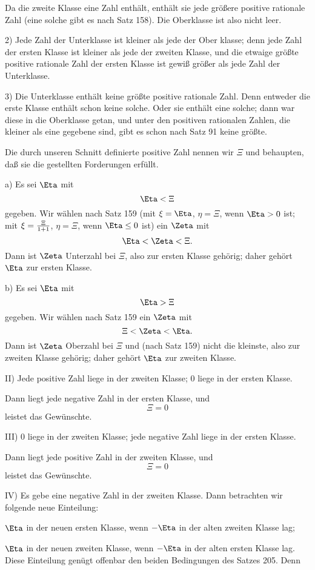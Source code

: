 Da die zweite Klasse eine Zahl enth\"alt, enth\"alt sie jede
gr\"o{\ss}ere positive rationale Zahl (eine solche gibt es nach Satz 158).
Die Oberklasse ist also nicht leer.

2) Jede Zahl der Unterklasse ist kleiner als jede der Ober%
klasse; denn jede Zahl der ersten Klasse ist kleiner als jede der
zweiten Klasse, und die etwaige gr\"o{\ss}te positive rationale Zahl der
ersten Klasse ist gewi{\ss} gr\"o{\ss}er als jede Zahl der Unterklasse.

3) Die Unterklasse enth\"alt keine gr\"o{\ss}te positive rationale
Zahl.  Denn entweder die erste Klasse enth\"alt schon keine solche.
Oder sie enth\"alt eine solche; dann war diese in die Oberklasse
getan, und unter den positiven rationalen Zahlen, die kleiner als
eine gegebene sind, gibt es schon nach Satz 91 keine gr\"o{\ss}te.

Die durch unseren Schnitt definierte positive Zahl nennen wir
$\Xi$ und behaupten, da{\ss} sie die gestellten Forderungen erf\"ullt.

a) Es sei $\Eta$ mit
$$\Eta < \Xi$$
gegeben.  Wir w\"ahlen nach Satz 159 (mit $\xi = \Eta$, $\eta = \Xi$, wenn
$\Eta > 0$ ist; mit $\xi = {\Xi \over 1 + 1}$, $\eta = \Xi$, wenn $\Eta \le 0$ ist) ein $\Zeta$ mit
$$\Eta < \Zeta < \Xi.$$
Dann ist $\Zeta$ Unterzahl bei $\Xi$, also zur ersten Klasse geh\"orig; daher
geh\"ort $\Eta$ zur ersten Klasse.

b) Es sei $\Eta$ mit
$$\Eta > \Xi$$
gegeben.  Wir w\"ahlen nach Satz 159 ein $\Zeta$ mit
$$\Xi < \Zeta < \Eta.$$
Dann ist $\Zeta$ Oberzahl bei $\Xi$ und (nach Satz 159) nicht die kleinste,
also zur zweiten Klasse geh\"orig; daher geh\"ort $\Eta$ zur zweiten
Klasse.

II) Jede positive Zahl liege in der zweiten Klasse; $0$ liege in
der ersten Klasse.

Dann liegt jede negative Zahl in der ersten Klasse, und
$$\Xi = 0$$
leistet das Gew\"unschte.

III) 0 liege in der zweiten Klasse; jede negative Zahl liege
in der ersten Klasse.

Dann liegt jede positive Zahl in der zweiten Klasse, und
$$\Xi = 0$$
leistet das Gew\"unschte.

IV) Es gebe eine negative Zahl in der zweiten Klasse.
Dann betrachten wir folgende neue Einteilung:
\bigskip

$\Eta$ in der neuen ersten Klasse, wenn $-\Eta$ in der alten zweiten
Klasse lag;

$\Eta$ in der neuen zweiten Klasse, wenn $-\Eta$ in der alten ersten
Klasse lag.
\bigskip
\noindent
Diese Einteilung gen\"ugt offenbar den beiden Bedingungen des
Satzes 205.  Denn

